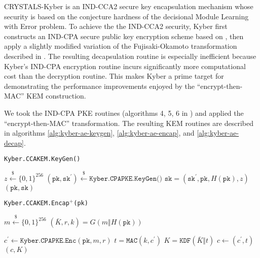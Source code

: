 \documentclass[floatrow,journal=tches,submission]{iacrtrans}
\newcommand{\mac}{\texttt{MAC}}
\newcommand{\pk}{\texttt{pk}}
\newcommand{\sk}{\texttt{sk}}
\newcommand{\leftsample}{\stackrel{\$}{\leftarrow}}
\begin{document}
CRYSTALS-Kyber \cite{bos2018crystals}\cite{avanzi2019crystals} is an IND-CCA2 secure key encapsulation mechanism whose security is based on the conjecture hardness of the decisional Module Learning with Error problem. To achieve the the IND-CCA2 security, Kyber first constructs an IND-CPA secure public key encryption scheme based on \cite{lpr2013ideal}, then apply a slightly modified variation of the Fujisaki-Okamoto transformation described in \cite{hofheinz2017modular}. The resulting decapsulation routine is especially inefficient because Kyber's IND-CPA encryption routine incurs significantly more computational cost than the decryption routine. This makes Kyber a prime target for demonstrating the performance improvements enjoyed by the ``encrypt-then-MAC'' KEM construction.

We took the IND-CPA PKE routines (algorithms 4, 5, 6 in \cite{avanzi2019crystals}) and applied the ``encrypt-then-MAC'' transformation. The resulting KEM routines are described in algorithms \ref{alg:kyber-ae-keygen}, \ref{alg:kyber-ae-encap}, and \ref{alg:kyber-ae-decap}.

\begin{algorithm}[H]
    \caption{\texttt{Kyber.CCAKEM.KeyGen()}}\label{alg:kyber-ae-keygen}
    \begin{algorithmic}[1]
        \State $z \leftsample \{0,1\}^{256}$
        \State $(\pk, \sk^\prime) \leftsample \texttt{Kyber.CPAPKE.KeyGen()}$
        \State $\sk = (\sk^\prime, \pk, H(\pk), z)$
        \State \Return $(\pk, \sk)$
    \end{algorithmic}
\end{algorithm}

\begin{algorithm}[H]
    \caption{\texttt{Kyber.CCAKEM.Encap$^+$(\pk)}}\label{alg:kyber-ae-encap}
    \begin{algorithmic}[1]
        \State $m \leftsample \{0,1\}^{256}$
        \State $(\bar{K}, r, k) = G(m \Vert H(\pk))$
 
        \State $c^\prime  \leftarrow \texttt{Kyber.CPAPKE.Enc}(\pk, m, r)$
            \State $t=\mac(k, c^\prime)$
        \State $K = \texttt{KDF}(\bar{K} \Vert t)$
        \State $c \leftarrow (c^\prime, t)$
        \State \Return $(c, K)$
    \end{algorithmic}
\end{algorithm}
\end{document}
